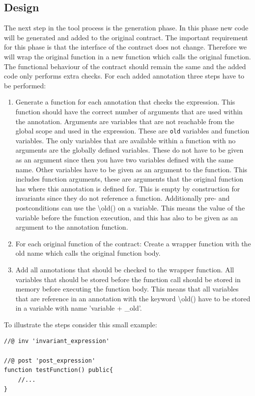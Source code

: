 \documentclass[a4paper]{article}
\begin{document}
\subsection{Design}
The next step in the tool process is the generation phase. In this phase new code will be generated and added to the original contract. The important requirement for this phase is that the interface of the contract does not change. Therefore we will wrap the original function in a new function which calls the original function. The functional behaviour of the contract should remain the same and the added code only performs extra checks. For each added annotation three steps have to be performed:
\begin{enumerate}
  \item Generate a function for each annotation that checks the expression. This function should have the correct number of arguments that are used within the annotation. Arguments are variables that are not reachable from the global scope and used in the expression. These are \texttt{old} variables and function variables. The only variables that are available within a function with no arguments are the globally defined variables. These do not have to be given as an argument since then you have two variables defined with the same name. Other variables have to be given as an argument to the function. This includes function arguments, these are arguments that the original function has where this annotation is defined for. This is empty by construction for invariants since they do not reference a function. Additionally pre- and postconditions can use the \textbackslash old() on a variable. This means the value of the variable before the function execution, and this has also to be given as an argument to the annotation function.
  \item For each original function of the contract: Create a wrapper function with the old name which calls the original function body.
  \item Add all annotations that should be checked to the wrapper function. All variables that should be stored before the function call should be stored in memory before executing the function body. This means that all variables that are reference in an annotation with the keyword \textbackslash old() have to be stored in a variable with name 'variable + \_old'.
\end{enumerate}
To illustrate the steps consider this small example:
\begin{lstlisting}[breaklines=true, language=Solidity ]
//@ inv 'invariant_expression'

//@ post 'post_expression'
function testFunction() public{
    //...
}
\end{lstlisting}
\end{document}
